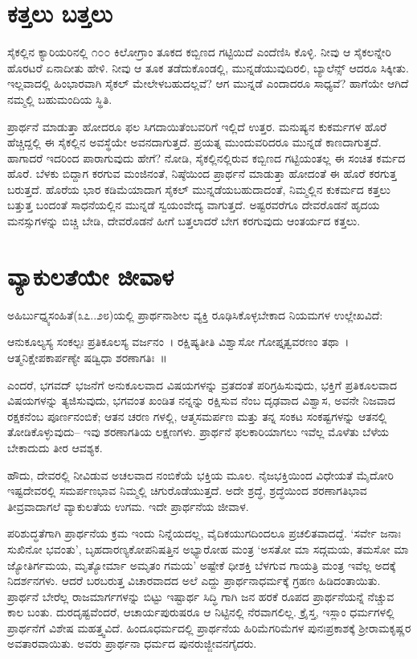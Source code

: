 \section{ಕತ್ತಲು ಬತ್ತಲು}

ಸೈಕಲ್ಲಿನ ಕ್ಯಾರಿಯರಿನಲ್ಲಿ ೧೦೦ ಕಿಲೋಗ್ರಾಂ ತೂಕದ ಕಬ್ಬಿಣದ ಗಟ್ಟಿಯಿದೆ ಎಂದೆಣಿಸಿ ಕೊಳ್ಳಿ. ನೀವು ಆ ಸೈಕಲನ್ನೇರಿ ಹೊರಟರೆ ಏನಾದೀತು ಹೇಳಿ. ನೀವು ಆ ತೂಕ ತಡೆದುಕೊಂಡಲ್ಲಿ, ಮುನ್ನಡೆಯುವುದಿರಲಿ, ಬ್ಯಾಲೆನ್ಸ್ ಆದರೂ ಸಿಕ್ಕೀತು. ಇಲ್ಲವಾದಲ್ಲಿ ಹಿಂಭಾರವಾಗಿ ಸೈಕಲ್ ಮೇಲೇಳಬಹುದಲ್ಲವೆ? ಆಗ ಮುನ್ನಡೆ ಎಂದಾದರೂ ಸಾಧ್ಯವೆ? ಹಾಗೆಯೇ ಆಗಿದೆ ನಮ್ಮಲ್ಲಿ ಬಹುಮಂದಿಯ ಸ್ಥಿತಿ.

ಪ್ರಾರ್ಥನೆ ಮಾಡುತ್ತಾ ಹೋದರೂ ಫಲ ಸಿಗದಾಯಿತೆಂಬವರಿಗೆ ಇಲ್ಲಿದೆ ಉತ್ತರ. ಮನುಷ್ಯನ ಕುಕರ್ಮಗಳ ಹೊರೆ ಹೆಚ್ಚಿದ್ದಲ್ಲಿ ಈ ಸೈಕಲ್ಲಿನ ಅವಸ್ಥೆಯೇ ಅವನದಾಗುತ್ತದೆ. ಪ್ರಯತ್ನ ಮುಂದುವರಿದರೂ ಮುನ್ನಡೆ ಕಾಣದಾಗುತ್ತದೆ. ಹಾಗಾದರೆ ಇದರಿಂದ ಪಾರಾಗುವುದು ಹೇಗೆ? ನೋಡಿ, ಸೈಕಲ್ಲಿನಲ್ಲಿರುವ ಕಬ್ಬಿಣದ ಗಟ್ಟಿಯಂತಲ್ಲ ಈ ಸಂಚಿತ ಕರ್ಮದ ಹೊರೆ. ಬೆಳಕು ಬಿದ್ದಾಗ ಕರಗುವ ಮಂಜಿನಂತೆ, ನಿಷ್ಠೆಯಿಂದ ಪ್ರಾರ್ಥನೆ ಮಾಡುತ್ತಾ ಹೋದಂತೆ ಈ ಹೊರೆ ಕರಗುತ್ತ ಬರುತ್ತದೆ. ಹೊರೆಯ ಭಾರ ಕಡಿಮೆಯಾದಾಗ ಸೈಕಲ್ ಮುನ್ನಡೆಯಬಹುದಾದಂತೆ, ನಿಮ್ಮಲ್ಲಿನ ಕುಕರ್ಮದ ಕತ್ತಲು ಬತ್ತುತ್ತ ಬಂದಂತೆ ಸಾಧನೆಯಲ್ಲಿನ ಮುನ್ನಡೆ ಸ್ವಯಂವೇದ್ಯ ವಾಗುತ್ತದೆ. ಅಷ್ಟರವರೆಗೂ ದೇವರೊಡನೆ ಹೃದಯ ಮನಸ್ಸುಗಳನ್ನು ಬಿಚ್ಚಿ ಬೇಡಿ, ದೇವರೊಡನೆ ಹೀಗೆ ಬತ್ತಲಾದರೆ ಬೇಗ ಕರಗುವುದು ಆಂತರ್ಯದ ಕತ್ತಲು.


\section{ವ್ಯಾಕುಲತೆಯೇ ಜೀವಾಳ}

ಅಹಿರ್ಬುಧ್ನ್ಯಸಂಹಿತೆ(೩೭..೨೮)ಯಲ್ಲಿ ಪ್ರಾರ್ಥನಾಶೀಲ ವ್ಯಕ್ತಿ ರೂಢಿಸಿಕೊಳ್ಳಬೇಕಾದ ನಿಯಮಗಳ ಉಲ್ಲೇಖವಿದೆ:

ಆನುಕೂಲ್ಯಸ್ಯ ಸಂಕಲ್ಪಃ ಪ್ರತಿಕೂಲಸ್ಯ ವರ್ಜನಂ~। ರಕ್ಷಿಷ್ಯತೀತಿ ವಿಶ್ವಾಸೋ ಗೋಪ್ತೃತ್ವವರಣಂ ತಥಾ~। ಆತ್ಮನಿಕ್ಷೇಪಕಾರ್ಪಣ್ಯೇ ಷಡ್ವಿಧಾ ಶರಣಾಗತಿಃ~॥

ಎಂದರೆ, ಭಗವದ್ ಭಜನೆಗೆ ಅನುಕೂಲವಾದ ವಿಷಯಗಳನ್ನು ವ್ರತದಂತೆ ಪರಿಗ್ರಹಿಸುವುದು, ಭಕ್ತಿಗೆ ಪ್ರತಿಕೂಲವಾದ ವಿಷಯಗಳನ್ನು ತ್ಯಜಿಸುವುದು, ಭಗವಂತ ಖಂಡಿತ ನನ್ನನ್ನು ರಕ್ಷಿಸುವ ನೆಂಬ ದೃಢವಾದ ವಿಶ್ವಾಸ, ಅವನೇ ನಿಜವಾದ ರಕ್ಷಕನೆಂಬ ಪೂರ್ಣನಂಬಿಕೆ; ಆತನ ಚರಣ ಗಳಲ್ಲಿ, ಆತ್ಮಸಮರ್ಪಣ ಮತ್ತು ತನ್ನ ಸಂಕಟ ಸಂಕಷ್ಟಗಳನ್ನು ಆತನಲ್ಲಿ ತೋಡಿಕೊಳ್ಳುವುದು– ಇವು ಶರಣಾಗತಿಯ ಲಕ್ಷಣಗಳು. ಪ್ರಾರ್ಥನೆ ಫಲಕಾರಿಯಾಗಲು ಇವೆಲ್ಲ ಮೊಳೆತು ಬೆಳೆಯ ಬೇಕಾದುದು ತೀರ ಆವಶ್ಯಕ.

ಹೌದು, ದೇವರಲ್ಲಿ ನೀವಿಡುವ ಅಚಲವಾದ ನಂಬಿಕೆಯೆ ಭಕ್ತಿಯ ಮೂಲ. ನೈಜಭಕ್ತಿಯಿಂದ ವಿಧೇಯತೆ ಮೈದೋರಿ ಇಷ್ಟದೇವರಲ್ಲಿ ಸಮರ್ಪಣಭಾವ ನಿಮ್ಮಲ್ಲಿ ಚಿಗುರೊಡೆಯುತ್ತದೆ. ಅದೇ ಶ್ರದ್ಧೆ, ಶ್ರದ್ಧೆಯಿಂದ ಶರಣಾಗತಿಭಾವ ತೀವ್ರವಾದಾಗಲೆ ವ್ಯಾಕುಲತೆಯ ಉಗಮ. ಇದೇ ಪ್ರಾರ್ಥನೆಯ ಜೀವಾಳ.

ಪರಿಶುದ್ಧತೆಗಾಗಿ ಪ್ರಾರ್ಥನೆಯ ಕ್ರಮ ಇಂದು ನಿನ್ನೆಯದಲ್ಲ, ವೈದಿಕಯುಗದಿಂದಲೂ ಪ್ರಚಲಿತವಾದದ್ದೆ. ‘ಸರ್ವೇ ಜನಾಃ ಸುಖಿನೋ ಭವಂತು’, ಬೃಹದಾರಣ್ಯಕೋಪನಿಷತ್ತಿನ ಅಭ್ಯಾರೋಹ ಮಂತ್ರ ‘ಅಸತೋ ಮಾ ಸದ್ಗಮಯ, ತಮಸೋ ಮಾ ಜ್ಯೋತಿರ್ಗಮಯ, ಮೃತ್ಯೋರ್ಮಾ ಅಮೃತಂ ಗಮಯ’ ಅಷ್ಟೇಕೆ ಧೀಶಕ್ತಿ ಬೆಳಗುವ ಗಾಯತ್ರಿ ಮಂತ್ರ ಇವೆಲ್ಲ ಅದಕ್ಕೆ ನಿದರ್ಶನಗಳು. ಆದರೆ ಬರಬರುತ್ತ ವಿಚಾರವಾದದ ಅಲೆ ಎದ್ದು ಪ್ರಾರ್ಥನಾಧರ್ಮಕ್ಕೆ ಗ್ರಹಣ ಹಿಡಿದಂತಾಯಿತು. ಪ್ರಾರ್ಥನೆ ಬೇರೆಲ್ಲ ರಾಜಮಾರ್ಗಗಳನ್ನು ಬಿಟ್ಟು ಇಷ್ಟಾರ್ಥ ಸಿದ್ಧಿ ಗಾಗಿ ಜನ ಹರಕೆ ರೂಪದ ಪ್ರಾರ್ಥನೆಯನ್ನೆ ನೆಚ್ಚುವ ಕಾಲ ಬಂತು. ದುರದೃಷ್ಟವೆಂದರೆ, ಆಚಾರ್ಯಪುರುಷರೂ ಆ ನಿಟ್ಟಿನಲ್ಲಿ ನೆರವಾಗಲಿಲ್ಲ. ಕ್ರೈಸ್ತ, ಇಸ್ಲಾಂ ಧರ್ಮಗಳಲ್ಲಿ ಪ್ರಾರ್ಥನೆಗೆ ವಿಶೇಷ ಮಹತ್ತ್ವವಿದೆ. ಹಿಂದೂಧರ್ಮದಲ್ಲಿ ಪ್ರಾರ್ಥನೆಯ ಹಿರಿಮೆಗರಿಮೆಗಳ ಪುನಃಪ್ರಕಾಶಕ್ಕೆ ಶ‍್ರೀರಾಮಕೃಷ್ಣರ ಅವತಾರವಾಯಿತು. ಅವರು ಪ್ರಾರ್ಥನಾ ಧರ್ಮದ ಪುನರುಜ್ಜೀವನಗೈದರು.


